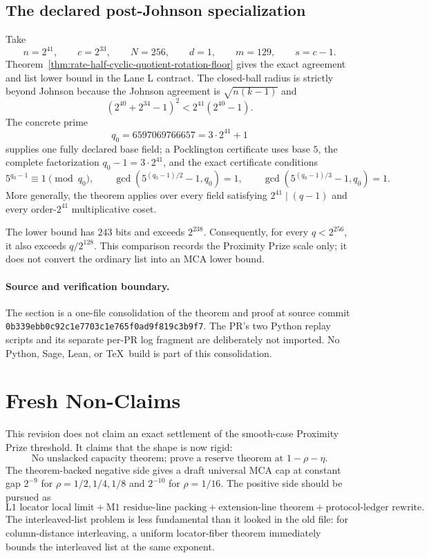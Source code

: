 \documentclass[11pt]{article}
\begin{document}
\subsection{The declared post-Johnson specialization}

Take
\[
  n=2^{41},
  \qquad
  c=2^{33},
  \qquad
  N=256,
  \qquad
  d=1,
  \qquad
  m=129,
  \qquad
  s=c-1.
\]
Theorem~\ref{thm:rate-half-cyclic-quotient-rotation-floor} gives the exact
agreement and list lower bound in the Lane L contract.  The closed-ball radius
is strictly beyond Johnson because the Johnson agreement is
\(\sqrt{n(k-1)}\) and
\[
  (2^{40}+2^{34}-1)^2<2^{41}(2^{40}-1).
\]
The concrete prime
\[
  q_0=6597069766657=3\cdot2^{41}+1
\]
supplies one fully declared base field; a Pocklington certificate uses base
\(5\), the complete factorization \(q_0-1=3\cdot2^{41}\), and the exact
certificate conditions
\[
  5^{q_0-1}\equiv1\pmod {q_0},
  \qquad
  \gcd\!\left(5^{(q_0-1)/2}-1,q_0\right)=1,
  \qquad
  \gcd\!\left(5^{(q_0-1)/3}-1,q_0\right)=1.
\]
More generally, the theorem applies over every field satisfying
\(2^{41}\mid(q-1)\) and every order-\(2^{41}\) multiplicative coset.

The lower bound has \(243\) bits and exceeds \(2^{238}\).  Consequently, for
every \(q<2^{256}\), it also exceeds \(q/2^{128}\).  This comparison records
the Proximity Prize scale only; it does not convert the ordinary list into an
MCA lower bound.

\paragraph{Source and verification boundary.}
The section is a one-file consolidation of the theorem and proof at source
commit \texttt{0b339ebb0c92c1e7703c1e765f0ad9f819c3b9f7}.  The PR's two
Python replay scripts and its separate per-PR log fragment are deliberately
not imported.  No Python, Sage, Lean, or \TeX\ build is part of this
consolidation.

\section{Fresh Non-Claims}
\label{sec:fresh-nonclaims}

This revision does not claim an exact settlement of the smooth-case Proximity
Prize threshold.  It claims that the shape is now rigid:
\[
  \boxed{\text{No unslacked capacity theorem; prove a reserve theorem at }
  1-\rho-\eta.}
\]
The theorem-backed negative side gives a draft universal MCA cap at constant gap
\(2^{-9}\) for \(\rho=1/2,1/4,1/8\) and \(2^{-10}\) for \(\rho=1/16\).  The
positive side should be pursued as
\[
  \text{L1 locator local limit}
  +\text{M1 residue-line packing}
  +\text{extension-line theorem}
  +\text{protocol-ledger rewrite}.
\]
The interleaved-list problem is less fundamental than it looked in the old file:
for column-distance interleaving, a uniform locator-fiber theorem immediately
bounds the interleaved list at the same exponent.
\end{document}
